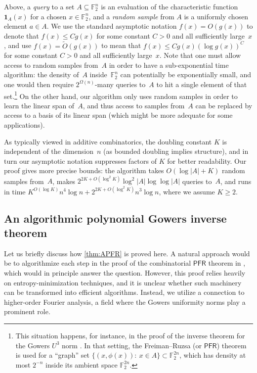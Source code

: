 \documentclass[11pt]{amsart}
\newcommand{\F}{\mathbb{F}} %
\newcommand{\PFR}{\textsf{PFR}}
\newcommand{\one}{\mathbf{1}}
\theoremstyle{plain}
\theoremstyle{definition}
\theoremstyle{remark}
\begin{document}
Above, a \emph{query} to a set $A \subseteq \F_2^n$ is an evaluation of the characteristic function $\one_A(x)$ for a chosen $x \in \F_2^n$, and a \emph{random sample} from $A$ is a uniformly chosen element $a\in A$.
We use the standard asymptotic notation $f(x) = O(g(x))$ to denote that $f(x) \leq Cg(x)$ for some constant $C>0$ and all sufficiently large~$x$, and use $f(x) = \widetilde{O}(g(x))$ to mean that $f(x) \leq Cg(x) (\log g(x))^C$ for some constant $C>0$ and all sufficiently large~$x$.
Note that one must allow access to random samples from~$A$ in order to have a sub-exponential time algorithm:
the density of~$A$ inside~$\F_2^n$ can potentially be exponentially small, and one would then require $2^{\Omega(n)}$-many queries to~$A$ to hit a single element of that set.\footnote{This situation happens, for instance, in the proof of the inverse theorem for the Gowers $U^3$ norm \cite{samorodnitsky2007low}.
In that setting, the Freiman--Ruzsa (or $\PFR$) theorem is used for a ``graph'' set $\big\{(x, \phi(x)):\: x\in A\big\} \subset \F_2^{2n}$, which has density at most $2^{-n}$ inside its ambient space $\F_2^{2n}$.}
On the other hand, our algorithm only uses random samples in order to learn the linear span of~$A$, and thus access to samples from~$A$ can be replaced by access to a basis of its linear span (which might be more adequate for some applications).


As typically viewed in additive combinatorics, the doubling constant $K$ is independent of the dimension~$n$ (as bounded doubling implies structure), and in turn our asymptotic notation suppresses factors of $K$ for better readability.
Our proof gives more precise bounds:
the algorithm takes $O(\log|A|+K)$ random samples from~$A$, makes $2^{2K+O(\log^2K)} \log^2 |A| \log\log|A|$ queries to~$A$, and runs in time $K^{O(\log K)} n^4 \log n + 2^{2K+O(\log^2K)} n^3 \log n$, where we assume $K\geq 2$.


\subsection{An algorithmic polynomial Gowers inverse theorem} 
Let us briefly discuss how \cref{thm:APFR} is proved here.
A natural approach  would be to algorithmize each step in the proof of the combinatorial $\PFR$ theorem in \cite{GowersGMT2025}, which would in principle  answer the question.
However, this proof relies heavily on entropy-minimization techniques, and it is unclear whether such machinery can be transformed into efficient algorithms.
Instead, we utilize a connection to higher-order Fourier analysis, a field where the Gowers uniformity norms play a prominent role.
\end{document}
